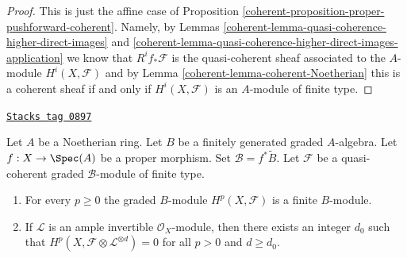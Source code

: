 \begin{proof}

This is just the affine case of
Proposition \ref{coherent-proposition-proper-pushforward-coherent}.
Namely, by Lemmas \ref{coherent-lemma-quasi-coherence-higher-direct-images} and
\ref{coherent-lemma-quasi-coherence-higher-direct-images-application} we know that
$R^if_*\mathcal{F}$ is the quasi-coherent sheaf associated
to the $A$-module $H^i(X, \mathcal{F})$
and by Lemma \ref{coherent-lemma-coherent-Noetherian} this is
a coherent sheaf if and only if $H^i(X, \mathcal{F})$
is an $A$-module of finite type.
\end{proof}

\begin{lemma}
\label{coherent-lemma-graded-finiteness}
\href{https://stacks.math.columbia.edu/tag/0897}{\texttt{Stacks tag 0897}}

Let $A$ be a Noetherian ring.
Let $B$ be a finitely generated graded $A$-algebra.
Let $f : X \to \Spec(A)$ be a proper morphism.
Set $\mathcal{B} = f^*\widetilde B$.
Let $\mathcal{F}$ be a quasi-coherent
graded $\mathcal{B}$-module of finite type.
\begin{enumerate}
\item For every $p \geq 0$ the graded $B$-module $H^p(X, \mathcal{F})$
is a finite $B$-module.
\item If $\mathcal{L}$ is an ample invertible $\mathcal{O}_X$-module,
then there exists an integer $d_0$ such that
$H^p(X, \mathcal{F} \otimes \mathcal{L}^{\otimes d}) = 0$
for all $p > 0$ and $d \geq d_0$.
\end{enumerate}
\end{lemma}

